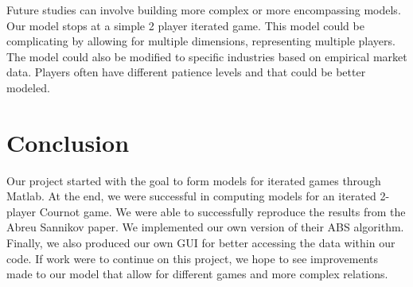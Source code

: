 \documentclass{article}
\begin{document}
Future studies can involve building more complex or more encompassing models. Our model stops at a simple 2 player iterated game. This model could be complicating by allowing for multiple dimensions, representing multiple players. The model could also be modified to specific industries based on empirical market data. Players often have different patience levels and that could be better modeled.

\section{Conclusion}

Our project started with the goal to form models for iterated games through Matlab. At the end, we were successful in computing models for an iterated 2-player Cournot game. We were able to successfully reproduce the results from the Abreu Sannikov paper. We implemented our own version of their ABS algorithm. Finally, we also produced our own GUI for better accessing the data within our code. If work were to continue on this project, we hope to see improvements made to our model that allow for different games and more complex relations.



\end{document}
